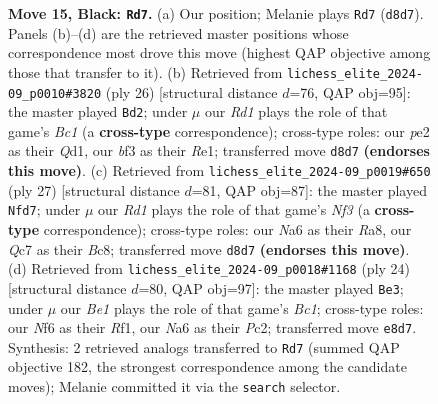 \documentclass[11pt]{article}
\begin{document}
\begin{figure}[p]
\caption{\textbf{Move 15, Black: \texttt{Rd7}.} (a) Our position; Melanie plays \texttt{Rd7} (\texttt{d8d7}). Panels (b)--(d) are the retrieved master positions whose correspondence most drove this move (highest QAP objective among those that transfer to it). (b) Retrieved from \texttt{lichess\_elite\_2024-09\_p0010\#3820} (ply 26) [structural distance $d$=76, QAP obj=95]: the master played \texttt{Bd2}; under $\mu$ our \emph{Rd1} plays the role of that game's \emph{Bc1} (a \textbf{cross-type} correspondence); cross-type roles: our \emph{p}e2 as their \emph{Q}d1, our \emph{b}f3 as their \emph{R}e1; transferred move \texttt{d8d7} \textbf{(endorses this move)}. (c) Retrieved from \texttt{lichess\_elite\_2024-09\_p0019\#650} (ply 27) [structural distance $d$=81, QAP obj=87]: the master played \texttt{Nfd7}; under $\mu$ our \emph{Rd1} plays the role of that game's \emph{Nf3} (a \textbf{cross-type} correspondence); cross-type roles: our \emph{N}a6 as their \emph{R}a8, our \emph{Q}c7 as their \emph{B}c8; transferred move \texttt{d8d7} \textbf{(endorses this move)}. (d) Retrieved from \texttt{lichess\_elite\_2024-09\_p0018\#1168} (ply 24) [structural distance $d$=80, QAP obj=97]: the master played \texttt{Be3}; under $\mu$ our \emph{Be1} plays the role of that game's \emph{Bc1}; cross-type roles: our \emph{N}f6 as their \emph{R}f1, our \emph{N}a6 as their \emph{P}c2; transferred move \texttt{e8d7}. Synthesis: 2 retrieved analogs transferred to \texttt{Rd7} (summed QAP objective 182, the strongest correspondence among the candidate moves); Melanie committed it via the \texttt{search} selector.}
\label{fig:thought-m29}
\end{figure}

\clearpage
\end{document}
